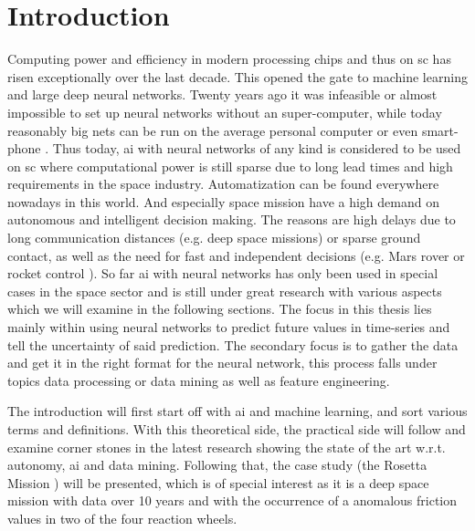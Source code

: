\chapter{Introduction}
Computing power and efficiency in modern processing chips and thus on \ac{sc} has risen exceptionally over the last decade. This opened the gate to machine learning and large deep neural networks. Twenty years ago it was infeasible or almost impossible to set up neural networks without an super-computer, while today reasonably big nets can be run on the average personal computer or even smart-phone \cite{efficient-nn}. Thus today, \ac{ai} with neural networks of any kind is considered to be used on \ac{sc} where computational power is still sparse due to long lead times and high requirements in the space industry. \newline
Automatization can be found everywhere nowadays in this world. And especially space mission have a high demand on autonomous and intelligent decision making. The reasons are high delays due to long communication distances (e.g. deep space missions) or sparse ground contact, as well as the need for fast and independent decisions (e.g. Mars rover \cite{mars-ai} or rocket control \cite{rocket-control}). \newline 
So far \ac{ai} with neural networks has only been used in special cases in the space sector and is still under great research with various aspects which we will examine in the following sections. The focus in this thesis lies mainly within using neural networks to predict future values in time-series and tell the uncertainty of said prediction. The secondary focus is to gather the data and get it in the right format for the neural network, this process falls under topics data processing or data mining as well as feature engineering.

The introduction will first start off with \ac{ai} and machine learning, and sort various terms and definitions. With this theoretical side, the practical side will follow and examine corner stones in the latest research showing the state of the art w.r.t. autonomy, \ac{ai} and data mining. Following that, the case study (the Rosetta Mission \cite{rosetta-url}) will be presented, which is of special interest as it is a deep space mission with data over 10 years and with the occurrence of a anomalous friction values in two of the four reaction wheels.

